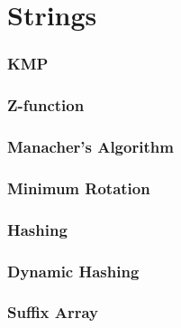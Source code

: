 \chapter{Strings}



\subsection{KMP}

\subsection{Z-function}

\subsection{Manacher's Algorithm}

\subsection{Minimum Rotation}

\subsection{Hashing}

\subsection{Dynamic Hashing}

\subsection{Suffix Array}



